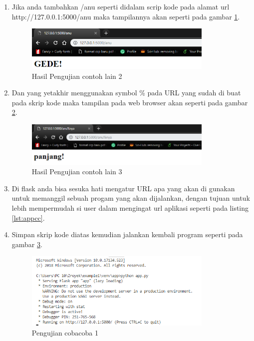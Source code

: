\begin{enumerate}
\item Jika anda tambahkan /anu seperti didalam scrip kode pada alamat url http://127.0.0.1:5000/anu maka tampilannya akan seperti pada gambar \ref{fig:hujicl2}.
\begin{figure}[!htbp]
	\centerline{\includegraphics[width=0.85\textwidth]{figures/9/hujicl2.PNG}}
	\caption{Hasil Pengujian contoh lain 2}
	\label{fig:hujicl2}
\end{figure}

\item Dan yang yetakhir menggunakan symbol \% pada URL yang sudah di buat pada skrip kode maka tampilan pada web browser akan seperti pada gambar \ref{fig:hujicl3}.
\begin{figure}[!htbp]
	\centerline{\includegraphics[width=0.85\textwidth]{figures/9/hujicl3.PNG}}
	\caption{Hasil Pengujian contoh lain 3}
	\label{fig:hujicl3}
\end{figure}

\item Di flask anda bisa sesuka hati mengatur URL apa yang akan di gunakan untuk memanggil sebuah progam yang akan dijalankan, dengan tujuan untuk lebih mempermudah si user dalam mengingat url aplikasi seperti pada listing \ref{lst:appcc}.

\item Simpan skrip kode diatas kemudian jalankan kembali program seperti pada gambar \ref{fig:ujicc1}.
\begin{figure}[!htbp]
	\centerline{\includegraphics[width=0.85\textwidth]{figures/9/ujicc1.PNG}}
	\caption{Pengujian cobacoba 1}
	\label{fig:ujicc1}
\end{figure}


\end{enumerate}
